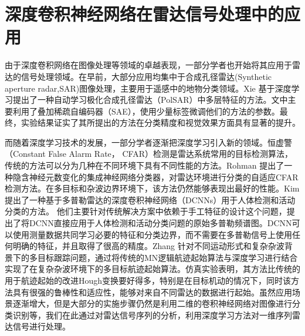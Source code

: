 \section{深度卷积神经网络在雷达信号处理中的应用}

由于深度卷积网络在图像处理等领域的卓越表现，一部分学者也开始将其应用于雷达的信号处理领域。在早前，大部分应用均集中于合成孔径雷达(Synthetic aperture radar,SAR)图像处理，主要用于遥感中的地物分类领域\cite{chen2014sar,xie2014multilayer,lv2014classification}。Xie \cite{xie2014multilayer}基于深度学习提出了一种自动学习极化合成孔径雷达（PolSAR）中多层特征的方法。文中主要利用了叠加稀疏自编码器（SAE），使用少量标签微调他们的方法的参数。最终，实验结果证实了其所提出的方法在分类精度和视觉效果方面具有显著的提升。

而随着深度学习技术的发展，一部分学者逐渐把深度学习引入新的领域。恒虚警 （Constant False Alarm Rate， CFAR）检测是雷达系统常用的目标检测算法，传统的方法可以分为几种在不同环境下具有不同性能的方法。Rohman \cite{rohman2017classification}提出了一种隐含神经元数变化的集成神经网络分类器，对雷达环境进行分类的自适应CFAR检测方法。在多目标和杂波边界环境下，该方法仍然能够表现出最好的性能。Kim提出了一种基于多普勒雷达的深度卷积神经网络（DCNNs）用于人体检测和活动分类的方法\cite{kim2016human}。 他们主要针对传统解决方案中依赖于手工特征的设计这个问题，提出了将DCNN直接应用于人体检测和活动分类问题的原始多普勒频谱图。DCNN可以使用测量数据共同学习必要的特征和分类边界，而不需要在多普勒信号上使用任何明确的特征，并且取得了很高的精度。Zhang \cite{zhang2017novel}针对不同运动形式和复杂杂波背景下的多目标跟踪问题，通过将传统的MN逻辑航迹起始算法与深度学习进行结合实现了在复杂杂波环境下的多目标航迹起始算法。仿真实验表明，其方法比传统的用于航迹起始的改进Hough变换要好得多，特别是在目标机动的情况下，同时该方法具有很强的鲁棒性和适应性，能够对来自不同雷达的数据进行起始。虽然应用场景逐渐增大，但是大部分的实施步骤仍然是利用二维的卷积神经网络对图像进行分类识别等，我们在此通过对雷达信号序列的分析，利用深度学习方法对一维序列雷达信号进行处理。

